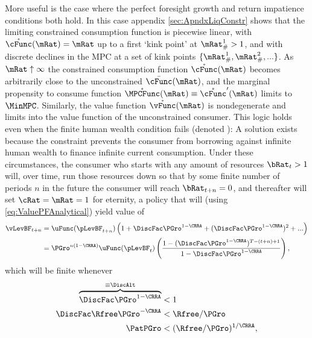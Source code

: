 \documentclass[BufferStockTheory]{subfiles}
\begin{document}
More useful is the case where the perfect foresight growth and return impatience conditions both hold.  In this case appendix \ref{sec:ApndxLiqConstr} shows that the limiting constrained consumption function is piecewise linear, with $\mathring{\cFunc}(\mRat)=\mRat$ up to a first `kink point' at $\mRat_{\#}^{1}>1$, and with discrete declines in the MPC at a set of kink points $\{\mRat_{\#}^{1},\mRat_{\#}^{2},...\}$.  As $\mRat \uparrow \infty$ the constrained consumption function $\mathring{\cFunc}(\mRat)$ becomes arbitrarily close to the unconstrained $\bar{\cFunc}(\mRat)$, and the marginal propensity to consume function $\mathring{\MPCFunc}(\mRat) \equiv \mathring{\cFunc}^{\prime}(\mRat)$ limits to $\MinMPC$.  Similarly, the value function $\mathring{\vFunc}(\mRat)$ is nondegenerate and limits into the value function of the unconstrained consumer.  This logic holds even when the finite human wealth condition fails (denoted \cncl{\FHWC}):  A solution exists because the constraint prevents the consumer from borrowing against infinite human wealth to finance infinite current consumption.  Under these circumstances, the consumer who starts with any amount of resources $\bRat_{t} > 1$ will, over time, run those resources down so that by some finite number of periods $n$ in the future the consumer will reach $\bRat_{t+n} = 0$, and thereafter will set $\cRat = \mRat = 1$ for eternity, a policy that will (using \eqref{eq:ValuePFAnalytical}) yield value of \hypertarget{PFFVAC}{}
\begin{equation}\begin{gathered}\begin{aligned}
  \vLevBF_{t+n}  & = \uFunc(\pLevBF_{t+n})\left(1+\DiscFac
                   \PGro^{1-\CRRA}+(\DiscFac \PGro^{1-\CRRA})^{2}+...\right) \notag
  \\  & = \PGro^{n(1-\CRRA)} \uFunc(\pLevBF_{t})\left(\frac{1-(\DiscFac
        \PGro^{1-\CRRA})^{T-(t+n)+1}}{1-\DiscFac \PGro^{1-\CRRA}}\right),
        \notag
\end{aligned}\end{gathered}\end{equation}
which will be finite whenever 
\begin{equation}\begin{gathered}\begin{aligned}
  \overbrace{\DiscFac \PGro^{1-\CRRA} }^{\equiv \DiscAlt}  & < 1 \label{eq:PFFVAC}
  \\ \DiscFac \Rfree \PGro^{-\CRRA}  & < \Rfree/\PGro \nonumber
  \\ \PatPGro  & < (\Rfree/\PGro)^{1/\CRRA}, \nonumber
\end{aligned}\end{gathered}\end{equation}
\end{document}
